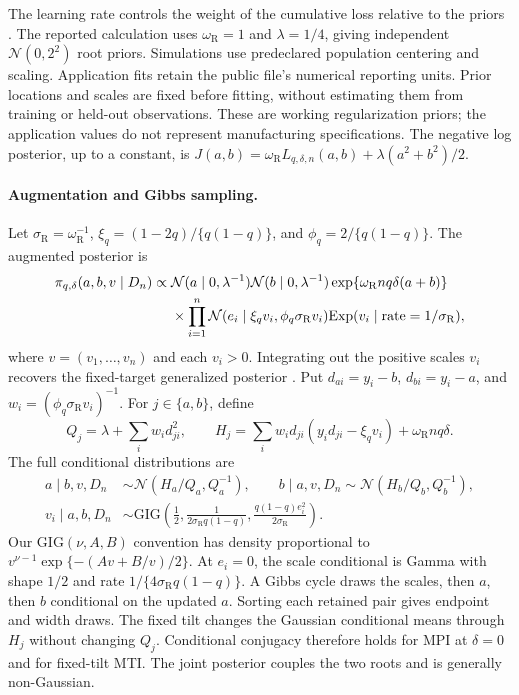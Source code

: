 \documentclass[11pt]{article}
\numberwithin{equation}{section}
\newcommand{\Normal}{\mathcal{N}}
\newcommand{\Exp}{\mathrm{Exp}}
\newcommand{\GIG}{\mathrm{GIG}}
\begin{document}
The learning rate controls the weight of the cumulative loss relative to the
priors \citep{BissiriHolmesWalker2016GeneralBayes}. The reported calculation
uses \(\omega_{\mathrm R}=1\) and \(\lambda=1/4\), giving independent
\(\Normal(0,2^2)\) root priors. Simulations use predeclared population
centering and scaling. Application fits retain the public file's numerical
reporting units. Prior locations and scales are fixed before fitting, without
estimating them from training or held-out observations. These are working
regularization priors; the application values do not represent manufacturing
specifications. The negative log
posterior, up to a constant, is
\(J(a,b)=\omega_{\mathrm R}L_{q,\delta,n}(a,b)+\lambda(a^2+b^2)/2\).

\paragraph{Augmentation and Gibbs sampling.}
Let \(\sigma_{\mathrm R}=\omega_{\mathrm R}^{-1}\),
\(\xi_q=(1-2q)/\{q(1-q)\}\), and
\(\phi_q=2/\{q(1-q)\}\). The augmented posterior is
\begin{align}
\pi_{q,\delta}(a,b,v\mid D_n)\propto{}&
\Normal(a\mid0,\lambda^{-1})\Normal(b\mid0,\lambda^{-1})
\exp\{\omega_{\mathrm R}nq\delta(a+b)\}\notag\\
&\times\prod_{i=1}^n
\Normal(e_i\mid\xi_qv_i,\phi_q\sigma_{\mathrm R}v_i)
\Exp(v_i\mid\mathrm{rate}=1/\sigma_{\mathrm R}),
\label{eq:mti-augmented-posterior}
\end{align}
where \(v=(v_1,\ldots,v_n)\) and each \(v_i>0\).
Integrating out the positive scales \(v_i\) recovers the fixed-target
generalized posterior \citep{KozumiKobayashi2011Gibbs}.
Put \(d_{ai}=y_i-b\), \(d_{bi}=y_i-a\), and
\(w_i=(\phi_q\sigma_{\mathrm R}v_i)^{-1}\). For \(j\in\{a,b\}\), define
\[
Q_j=\lambda+\sum_iw_i d_{ji}^2,\qquad
H_j=\sum_iw_i d_{ji}(y_i d_{ji}-\xi_qv_i)
+\omega_{\mathrm R}nq\delta.
\]
The full conditional distributions are
\begin{align}
a\mid b,v,D_n&\sim\Normal(H_a/Q_a,Q_a^{-1}),\qquad
b\mid a,v,D_n\sim\Normal(H_b/Q_b,Q_b^{-1}),
\label{eq:mti-root-conditionals}\\
v_i\mid a,b,D_n
&\sim\GIG\left(\frac12,
\frac{1}{2\sigma_{\mathrm R}q(1-q)},
\frac{q(1-q)e_i^2}{2\sigma_{\mathrm R}}\right).
\label{eq:mti-scale-conditional}
\end{align}
Our \(\GIG(\nu,A,B)\) convention has density proportional to
\(v^{\nu-1}\exp\{-(Av+B/v)/2\}\). At \(e_i=0\), the scale conditional
is Gamma with shape \(1/2\) and rate \(1/\{4\sigma_{\mathrm R}q(1-q)\}\).
A Gibbs cycle draws the scales, then \(a\), then \(b\) conditional on
the updated \(a\). Sorting each retained pair gives endpoint and width draws.
The fixed tilt changes the Gaussian conditional means through \(H_j\)
without changing \(Q_j\). Conditional conjugacy therefore holds for MPI
at \(\delta=0\) and for fixed-tilt MTI. The joint posterior couples the two
roots and is generally non-Gaussian.
\end{document}
